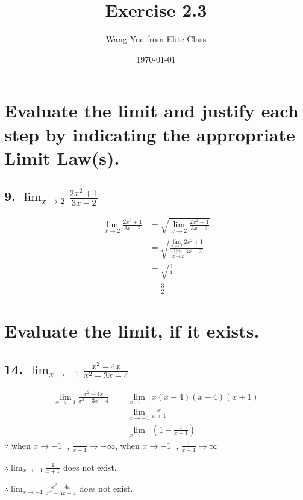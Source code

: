 \documentclass{article}
\begin{document}
    \title{Exercise 2.3}
    \author{Wang Yue from Elite Class}
    \date{\today}

    \maketitle

    \section*{Evaluate the limit and justify each step by indicating the appropriate Limit Law(s).}

    \subsection*{9. $\lim_{x \to 2}\frac{2x^2+1}{3x-2}$}

    $$
    \begin{aligned}
        \lim_{x\to 2}\frac{2x^2+1}{3x-2} &= \sqrt{\lim_{x \to 2}\frac{2x^2+1}{3x-2}} \\
        &= \sqrt{\frac{\lim_{x \to 2}2x^2+1}{\lim_{x \to 2}3x-2}} \\
        &= \sqrt{\frac{9}{4}} \\
        &= \frac{3}{2}
    \end{aligned}
    $$

    \section*{Evaluate the limit, if it exists.}

    \subsection*{14. $\lim_{x \to -1}\frac{x^2-4x}{x^2-3x-4}$}

    $$
    \begin{aligned}
        \lim_{x \to -1}\frac{x^2-4x}{x^2-3x-4} &= \lim_{x \to -1}{x(x-4)}{(x-4)(x+1)} \\
        &= \lim_{x \to -1}\frac{x}{x + 1} \\
        &= \lim_{x \to -1}(1 - \frac{1}{x + 1})
    \end{aligned}
    $$
    $\because$ when $x \to -1^-$, $\frac{1}{x+1} \to -\infty$, when $x \to -1^+$, $\frac{1}{x+1} \to \infty$

    $\therefore \lim_{x \to -1}\frac{1}{x+1}$ does not exist. 

    $\therefore \lim_{x \to -1}\frac{x^2-4x}{x^2-3x-4}$ does not exist.
\end{document}
